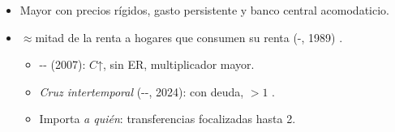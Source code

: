\documentclass{article}
\begin{document}
\begin{columnas}
\begin{itemize}
  \begin{itemize}
  \item precios flexibles: $\Gamma<1$; : $\approx$0,87;
  \item tipo real constante: \emph{exactamente 1};
  \item límite inferior: $>1$ (\hyperref[rep:III.2]{III.2}).
  \end{itemize}
\item Mayor con precios rígidos, gasto persistente y banco central acomodaticio.
\end{itemize}
\begin{itemize}
\item $\approx$mitad de la renta a hogares que consumen su renta (-, 1989) .
  \begin{itemize}
  \item {}-- (2007): $C$↑, sin ER, multiplicador mayor.
  \item \emph{Cruz intertemporal} (--, 2024): con deuda, $>1$ .
  \item Importa \emph{a quién}: transferencias focalizadas hasta 2.
  \end{itemize}
\end{itemize}


\end{columnas}
\end{document}
